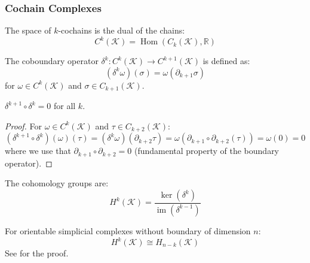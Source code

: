 \subsubsection{Cochain Complexes}

\begin{definition}\label{def:espacio_cocadenas}
The space of $k$-cochains is the dual of the chains:
\begin{equation}
    C^k(\mathcal{K}) = \operatorname{Hom}(C_k(\mathcal{K}), \mathbb{R})
\end{equation}
\end{definition}

\begin{definition}\label{def:operador_coborde}
The coboundary operator $\delta^k: C^k(\mathcal{K}) \to C^{k+1}(\mathcal{K})$ is defined as:
\begin{equation}
    (\delta^k \omega)(\sigma) = \omega(\partial_{k+1} \sigma)
\end{equation}
for $\omega \in C^k(\mathcal{K})$ and $\sigma \in C_{k+1}(\mathcal{K})$.
\end{definition}

\begin{theorem}\label{thm:coborde_coborde_cero}
$\delta^{k+1} \circ \delta^k = 0$ for all $k$.
\end{theorem}

\begin{proof}
For $\omega \in C^k(\mathcal{K})$ and $\tau \in C_{k+2}(\mathcal{K})$:
\[
(\delta^{k+1} \circ \delta^k)(\omega)(\tau) = (\delta^k \omega)(\partial_{k+2}\tau) = \omega(\partial_{k+1} \circ \partial_{k+2}(\tau)) = \omega(0) = 0
\]
where we use that $\partial_{k+1} \circ \partial_{k+2} = 0$ (fundamental property of the boundary operator).
\end{proof}

\begin{definition}\label{def:grupos_cohomologia}
The cohomology groups are:
\begin{equation}
    H^k(\mathcal{K}) = \frac{\ker(\delta^k)}{\operatorname{im}(\delta^{k-1})}
\end{equation}
\end{definition}

\begin{theorem}\label{thm:dualidad_poincare_complejos}
For orientable simplicial complexes without boundary of dimension $n$:
\begin{equation}
    H^k(\mathcal{K}) \cong H_{n-k}(\mathcal{K})
\end{equation}
See \citep{Hatcher2002} for the proof.
\end{theorem}

